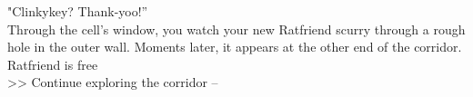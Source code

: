 "Clinkykey? Thank-yoo!”\\

Through the cell’s window, you watch your new Ratfriend scurry through a rough hole in the outer wall. Moments later, it appears at the other end of the corridor.\\

 Ratfriend is free\\
>> Continue exploring the corridor -- 
